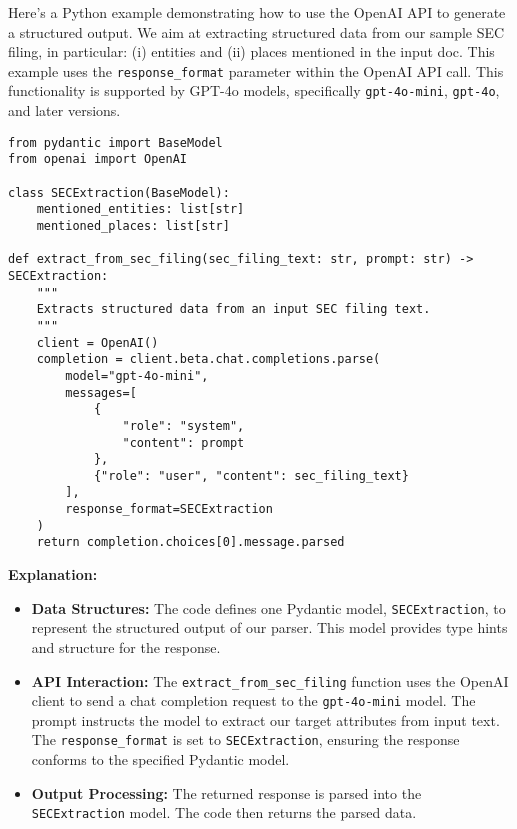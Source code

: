 Here's a Python example demonstrating how to use the OpenAI API to generate a structured output. We aim at extracting structured data from our sample SEC filing, in particular: (i) entities and (ii) places mentioned in the input doc. This example uses the \texttt{response\_format} parameter within the OpenAI API call. This functionality is supported by GPT-4o models, specifically \texttt{gpt-4o-mini}, \texttt{gpt-4o}, and later versions.

\begin{verbatim}
from pydantic import BaseModel
from openai import OpenAI

class SECExtraction(BaseModel):
    mentioned_entities: list[str]
    mentioned_places: list[str]

def extract_from_sec_filing(sec_filing_text: str, prompt: str) -> SECExtraction:
    """
    Extracts structured data from an input SEC filing text.
    """
    client = OpenAI()
    completion = client.beta.chat.completions.parse(
        model="gpt-4o-mini",
        messages=[
            {
                "role": "system",
                "content": prompt
            },
            {"role": "user", "content": sec_filing_text}
        ],
        response_format=SECExtraction
    )
    return completion.choices[0].message.parsed
\end{verbatim}
\textbf{Explanation:}

\begin{itemize}
    \item \textbf{Data Structures:} The code defines one Pydantic model, \texttt{SECExtraction}, to represent the structured output of our parser. This model provides type hints and structure for the response.
    \item \textbf{API Interaction:} The \texttt{extract\_from\_sec\_filing} function uses the OpenAI client to send a chat completion request to the \texttt{gpt-4o-mini} model. The prompt instructs  the model to extract our target attributes from input text. The \texttt{response\_format} is set to \texttt{SECExtraction}, ensuring the response conforms to the specified Pydantic model.
    \item \textbf{Output Processing:} The returned response is parsed into the \texttt{SECExtraction} model. The code then returns the parsed data.
\end{itemize}


